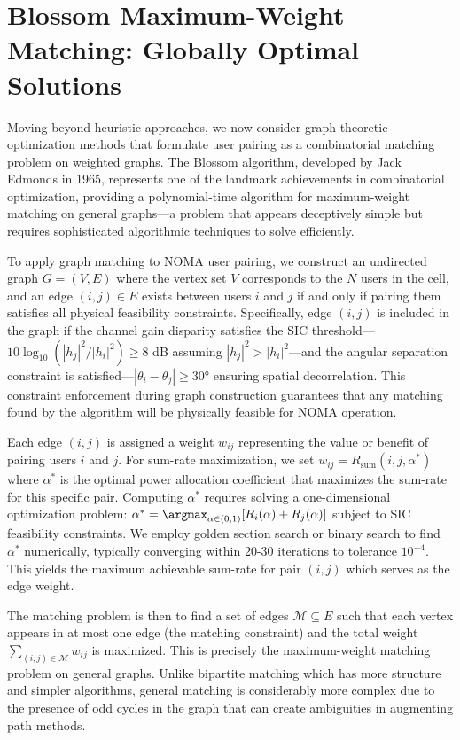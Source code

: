 \section{Blossom Maximum-Weight Matching: Globally Optimal Solutions}

Moving beyond heuristic approaches, we now consider graph-theoretic optimization methods that formulate user pairing as a combinatorial matching problem on weighted graphs. The Blossom algorithm, developed by Jack Edmonds in 1965, represents one of the landmark achievements in combinatorial optimization, providing a polynomial-time algorithm for maximum-weight matching on general graphs—a problem that appears deceptively simple but requires sophisticated algorithmic techniques to solve efficiently.

To apply graph matching to NOMA user pairing, we construct an undirected graph $G = (V, E)$ where the vertex set $V$ corresponds to the $N$ users in the cell, and an edge $(i,j) \in E$ exists between users $i$ and $j$ if and only if pairing them satisfies all physical feasibility constraints. Specifically, edge $(i,j)$ is included in the graph if the channel gain disparity satisfies the SIC threshold—$10\log_{10}(|h_j|^2 / |h_i|^2) \geq 8$ dB assuming $|h_j|^2 > |h_i|^2$—and the angular separation constraint is satisfied—$|\theta_i - \theta_j| \geq 30°$ ensuring spatial decorrelation. This constraint enforcement during graph construction guarantees that any matching found by the algorithm will be physically feasible for NOMA operation.

Each edge $(i,j)$ is assigned a weight $w_{ij}$ representing the value or benefit of pairing users $i$ and $j$. For sum-rate maximization, we set $w_{ij} = R_{\text{sum}}(i,j,\alpha^*)$ where $\alpha^*$ is the optimal power allocation coefficient that maximizes the sum-rate for this specific pair. Computing $\alpha^*$ requires solving a one-dimensional optimization problem: $\alpha^* = \argmax_{\alpha \in (0,1)} [R_i(\alpha) + R_j(\alpha)]$ subject to SIC feasibility constraints. We employ golden section search or binary search to find $\alpha^*$ numerically, typically converging within 20-30 iterations to tolerance $10^{-4}$. This yields the maximum achievable sum-rate for pair $(i,j)$ which serves as the edge weight.

The matching problem is then to find a set of edges $\mathcal{M} \subseteq E$ such that each vertex appears in at most one edge (the matching constraint) and the total weight $\sum_{(i,j) \in \mathcal{M}} w_{ij}$ is maximized. This is precisely the maximum-weight matching problem on general graphs. Unlike bipartite matching which has more structure and simpler algorithms, general matching is considerably more complex due to the presence of odd cycles in the graph that can create ambiguities in augmenting path methods.

